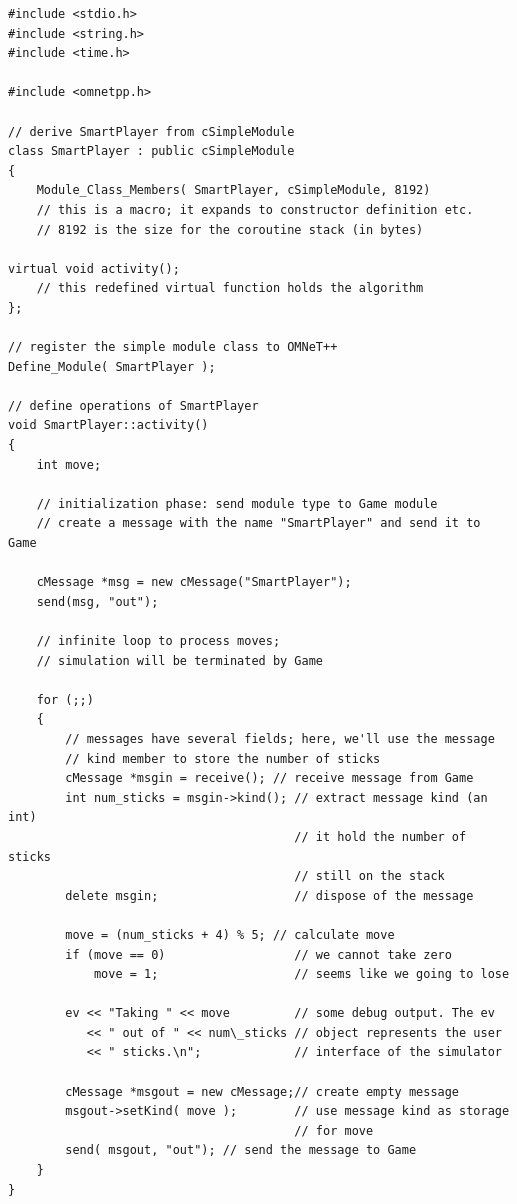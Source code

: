 \begin{verbatim}
#include <stdio.h>
#include <string.h>
#include <time.h>

#include <omnetpp.h>

// derive SmartPlayer from cSimpleModule
class SmartPlayer : public cSimpleModule
{
    Module_Class_Members( SmartPlayer, cSimpleModule, 8192)
    // this is a macro; it expands to constructor definition etc.
    // 8192 is the size for the coroutine stack (in bytes)

virtual void activity();
    // this redefined virtual function holds the algorithm
};

// register the simple module class to OMNeT++
Define_Module( SmartPlayer );

// define operations of SmartPlayer
void SmartPlayer::activity()
{
    int move;

    // initialization phase: send module type to Game module
    // create a message with the name "SmartPlayer" and send it to Game

    cMessage *msg = new cMessage("SmartPlayer");
    send(msg, "out");

    // infinite loop to process moves;
    // simulation will be terminated by Game

    for (;;)
    {
        // messages have several fields; here, we'll use the message
        // kind member to store the number of sticks
        cMessage *msgin = receive(); // receive message from Game
        int num_sticks = msgin->kind(); // extract message kind (an int)
                                        // it hold the number of sticks
                                        // still on the stack
        delete msgin;                   // dispose of the message

        move = (num_sticks + 4) % 5; // calculate move
        if (move == 0)                  // we cannot take zero
            move = 1;                   // seems like we going to lose

        ev << "Taking " << move         // some debug output. The ev
           << " out of " << num\_sticks // object represents the user
           << " sticks.\n";             // interface of the simulator

        cMessage *msgout = new cMessage;// create empty message
        msgout->setKind( move );        // use message kind as storage
                                        // for move
        send( msgout, "out"); // send the message to Game
    }
}
\end{verbatim}


